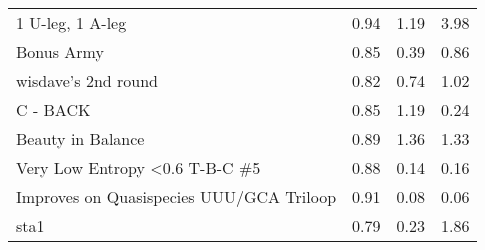 \documentclass[letter]{bioinfo}
\begin{document}
\begin{center}
\begin{longtable}{l ccc}
1 U-leg, 1 A-leg				&0.94 	&1.19 	&3.98 \\
Bonus Army					&0.85 	&0.39 	&0.86 \\
wisdave's 2nd round			&0.82 	&0.74 	&1.02 \\
C - BACK						&0.85 	&1.19 	&0.24 \\
Beauty in Balance				&0.89 	&1.36 	&1.33 \\
Very Low Entropy <0.6 T-B-C \#5	&0.88 	&0.14 	&0.16 \\
Improves on Quasispecies UUU/GCA Triloop	&0.91 	&0.08 	&0.06 \\
sta1							&0.79 	&0.23 	&1.86 \\

\end{longtable}
\end{center}



\newpage



\end{document}
